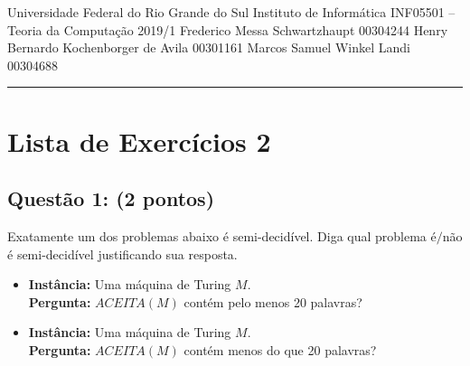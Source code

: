 \documentclass{article}
\begin{document}
  \noindent
  Universidade Federal do Rio Grande do Sul \hfill Instituto de Inform\'atica \newline
  INF05501 -- Teoria da Computa\c{c}\~ao \hfill 2019/1 \newline
  Frederico Messa Schwartzhaupt \hfill 00304244 \newline
  Henry Bernardo Kochenborger de Avila \hfill 00301161 \newline
  Marcos Samuel Winkel Landi \hfill 00304688
  \rule{\linewidth}{1.pt}

  \section*{\centering Lista de Exerc\'icios 2}

  \subsection*{Quest\~ao 1: (2 pontos)} Exatamente um dos problemas abaixo \'e semi-decid\'ivel. Diga qual problema \'e$/$n\~ao \'e semi-decid\'ivel justificando sua resposta. \\
    \begin{itemize}[label={}]
      \item
        \fbox
        {
          \parbox{\textwidth}
          {
            \textbf{Instância:} Uma m\'aquina de Turing $M$. \\
            \textbf{Pergunta:} $ACEITA(M)$ cont\'em pelo menos 20 palavras? \\
          }
        }
      \item
        \fbox
        {
          \parbox{\textwidth}
          {
          \textbf{Instância:} Uma m\'aquina de Turing $M$.\\
          \textbf{Pergunta:} $ACEITA(M)$ cont\'em menos do que 20 palavras? \\
          }
        }
    \end{itemize}
\end{document}
